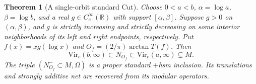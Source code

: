 \documentclass[12pt]{article}
\newtheorem{theorem}{Theorem}[section]
\theoremstyle{definition}
\theoremstyle{remark}
\begin{document}
\begin{theorem}[A single-orbit standard Cut]\label{thm:singleorbit}
Choose \(0<a<b\), \(\alpha=\log a\), \(\beta=\log b\), and a real
\(g\in C_c^\infty(\mathbb R)\) with support \([\alpha,\beta]\).
Suppose \(g>0\) on \((\alpha,\beta)\), and \(g\) is strictly increasing and
strictly decreasing on some interior neighborhoods of its left and right
endpoints, respectively. Put \(f(x)=xg(\log x)\) and
\(O_f=(2/\pi)\arctan T(f)\). Then
\begin{equation}\label{eq:singleorbit}
 \mathrm{Vir}_c(b,\infty)\subset N^-_{O_f}
 \subset\mathrm{Vir}_c(a,\infty)\subsetneq M .
\end{equation}
The triple \((N^-_{O_f}\subset M,\Omega)\) is a proper standard \(+\)hsm
inclusion. Its translations and strongly additive net are recovered from its
modular operators.
\end{theorem}
\end{document}
